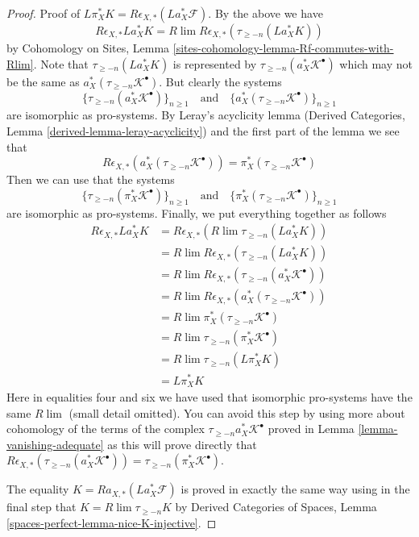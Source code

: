 \documentclass{stacks-project}
\theoremstyle{plain}
\theoremstyle{definition}
\theoremstyle{remark}
\numberwithin{equation}{subsection}
\def\lim{\mathop{\mathrm{lim}}\nolimits}
\begin{document}
\begin{proof}
\medskip\noindent
Proof of $L\pi_X^*K = R\epsilon_{X, *}(La_X^*\mathcal{F})$.
By the above we have
$$
R\epsilon_{X, *}La_X^*K =
R\lim R\epsilon_{X, *}(\tau_{\geq -n}(La_X^*K))
$$
by Cohomology on Sites, Lemma
\ref{sites-cohomology-lemma-Rf-commutes-with-Rlim}.
Note that $\tau_{\geq -n}(La_X^*K)$ is represented by
$\tau_{\geq -n}(a_X^*\mathcal{K}^\bullet)$ which may not be the
same as $a_X^*(\tau_{\geq -n}\mathcal{K}^\bullet)$.
But clearly the systems
$$
\{\tau_{\geq -n}(a_X^*\mathcal{K}^\bullet)\}_{n \geq 1}
\quad\text{and}\quad
\{a_X^*(\tau_{\geq -n}\mathcal{K}^\bullet)\}_{n \geq 1}
$$
are isomorphic as pro-systems.
By Leray's acyclicity lemma
(Derived Categories, Lemma \ref{derived-lemma-leray-acyclicity})
and the first part of the lemma we see that
$$
R\epsilon_{X, *}(a_X^*(\tau_{\geq -n}\mathcal{K}^\bullet)) =
\pi_X^*(\tau_{\geq -n}\mathcal{K}^\bullet)
$$
Then we can use that the systems
$$
\{\tau_{\geq -n}(\pi_X^*\mathcal{K}^\bullet)\}_{n \geq 1}
\quad\text{and}\quad
\{\pi_X^*(\tau_{\geq -n}\mathcal{K}^\bullet)\}_{n \geq 1}
$$
are isomorphic as pro-systems. Finally, we put everything together as follows
\begin{align*}
R\epsilon_{X, *}La_X^*K
& =
R\epsilon_{X, *} (R\lim \tau_{\geq -n}(La_X^*K)) \\
& =
R\lim R\epsilon_{X, *}(\tau_{\geq -n}(La_X^*K)) \\
& =
R\lim R\epsilon_{X, *}(\tau_{\geq -n}(a_X^*\mathcal{K}^\bullet)) \\
& =
R\lim R\epsilon_{X, *}(a_X^*(\tau_{\geq -n}\mathcal{K}^\bullet)) \\
& =
R\lim \pi_X^*(\tau_{\geq -n}\mathcal{K}^\bullet) \\
& =
R\lim \tau_{\geq -n}(\pi_X^*\mathcal{K}^\bullet) \\
& =
R\lim \tau_{\geq -n}(L\pi_X^*K) \\
& =
L\pi_X^*K
\end{align*}
Here in equalities four and six we have used that isomorphic
pro-systems have the same $R\lim$ (small detail omitted).
You can avoid this step by using more about cohomology of the terms
of the complex $\tau_{\geq -n}a_X^*\mathcal{K}^\bullet$ proved
in Lemma \ref{lemma-vanishing-adequate} as this will prove
directly that $R\epsilon_{X, *}(\tau_{\geq -n}(a_X^*\mathcal{K}^\bullet)) =
\tau_{\geq -n}(\pi_X^*\mathcal{K}^\bullet)$.

\medskip\noindent
The equality $K = Ra_{X, *}(La_X^*\mathcal{F})$ is
proved in exactly the same way using in the final step that
$K = R\lim \tau_{\geq -n}K$ by
Derived Categories of Spaces, Lemma \ref{spaces-perfect-lemma-nice-K-injective}.
\end{proof}
\end{document}
